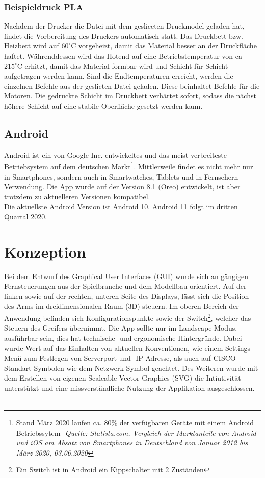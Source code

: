 \documentclass[12pt,					%
							 oneside,			%
							 a4paper,			%
							 halfparskip,		%
							 liststotoc,			%
							 bibtotoc,			%
							 fleqn,				%
							 pointlessnumbers]	%
							 {scrreprt}
\begin{document}
\subsection{Beispieldruck PLA}
Nachdem der Drucker die Datei mit dem gesliceten Druckmodel geladen hat, findet die Vorbereitung des Druckers automatisch statt.
Das Druckbett bzw. Heizbett wird auf $60^\circ\text{C}$ vorgeheizt, damit das Material besser an der Druckfläche haftet.
Währenddessen wird das Hotend auf eine Betriebstemperatur von ca  $215^\circ\text{C}$ erhitzt, damit das Material formbar wird und Schicht für Schicht aufgetragen werden kann.
Sind die Endtemperaturen erreicht, werden die einzelnen Befehle aus der geslicten Datei geladen. Diese beinhaltet Befehle für die Motoren.
Die gedruckte Schicht im Druckbett verhärtet sofort, sodass die nächst höhere Schicht auf eine stabile Oberfläche gesetzt werden kann.
\section{Android}
Android ist ein von Google Inc. entwickeltes und das meist verbreiteste Betriebsystem auf dem deutschen Markt\footnote{Stand März 2020 laufen ca. 80\% der verfügbaren Geräte mit einem Android Betriebssytem -\textit{Quelle: Statista.com, \glqq{}Vergleich der Marktanteile von Android und iOS am Absatz von Smartphones in Deutschland von Januar 2012 bis März 2020\grqq{}, 03.06.2020}\cite{Tenzer2020}}. Mittlerweile findet es nicht mehr nur in Smartphones, sondern auch in Smartwatches, Tablets und in Fernsehern Verwendung. Die App wurde auf der Version 8.1 (Oreo) entwickelt, ist aber trotzdem zu aktuelleren Versionen kompatibel. \\
Die aktuellste Android Version ist Android 10. Android 11 folgt im dritten Quartal 2020.
\chapter{Konzeption}
Bei dem Entwurf des Graphical User Interfaces (GUI) wurde sich an gängigen Fernsteuerungen aus der Spielbranche und dem Modellbau orientiert. Auf der linken sowie auf der rechten, unteren Seite des Displays, lässt sich die Position des Arms im dreidimensionalen Raum (3D) steuern. Im oberen Bereich der Anwendung befinden sich Konfigurationspunkte sowie der \glqq{}Switch\grqq{}\footnote{Ein Switch ist in Android ein Kippschalter mit 2 Zuständen}, welcher das Steuern des Greifers übernimmt. Die App sollte nur im \glqq{}Landscape\grqq{}-Modus, ausführbar sein, dies hat technische- und ergonomische Hintergründe. Dabei wurde Wert auf das Einhalten von aktuellen Konventionen, wie einem Settings Menü zum Festlegen von Serverport und -IP Adresse, als auch auf CISCO Standart Symbolen wie dem Netzwerk-Symbol geachtet. Des Weiteren wurde mit dem Erstellen von eigenen Scaleable Vector Graphics (SVG) die Intiutivität unterstützt und eine missverständliche Nutzung der Applikation ausgeschlossen.\\ \\
\end{document}
